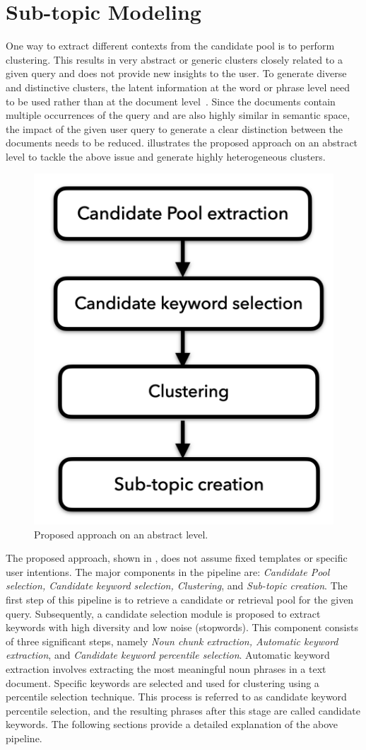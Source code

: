 
\chapter{Sub-topic Modeling}

One way to extract different contexts from the candidate pool is to perform clustering. This results in very abstract or generic clusters closely related to a given query and does not provide new insights to the user. To generate diverse and distinctive clusters, the latent information at the word or phrase level need to be used rather than at the document level~\cite{blei2003latent}. Since the documents contain multiple occurrences of the query and are also highly similar in semantic space, the impact of the given user query to generate a clear distinction between the documents needs to be reduced.  illustrates the proposed approach on an abstract level to tackle the above issue and generate highly heterogeneous clusters.


\begin{figure}[h]
	\centering
	\includegraphics[width=.45\textwidth]{images/thesis_images/methodology.png}
	\caption{Proposed approach on an abstract level. \label{fig:methodology2}}
\end{figure}

The proposed approach, shown in , does not assume fixed templates or specific user intentions. The major components in the pipeline are: \emph{Candidate Pool selection, Candidate keyword selection, Clustering}, and \emph{Sub-topic creation}. The first step of this pipeline is to retrieve a candidate or retrieval pool for the given query. Subsequently, a candidate selection module is proposed to extract keywords with high diversity and low noise (stopwords). This component consists of three significant steps, namely \emph{Noun chunk extraction, Automatic keyword extraction}, and \emph{Candidate keyword percentile selection}. Automatic keyword extraction involves extracting the most meaningful noun phrases in a text document. Specific keywords are selected and used for clustering using a percentile selection technique. This process is referred to as candidate keyword percentile selection, and the resulting phrases after this stage are called candidate keywords. The following sections provide a detailed explanation of the above pipeline.




